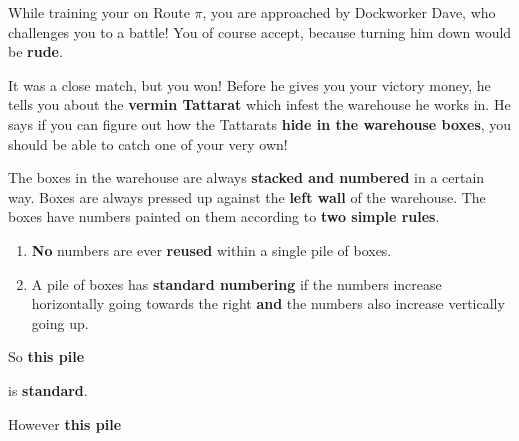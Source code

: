 
While training your \mappMobimon{} on Route \( \pi \), you are approached by
Dockworker Dave, who challenges you to a \mappMobimon{} battle! You of course
accept, because turning him down would be \textbf{rude}.

It was a close match, but you won! Before he gives you your victory money, he
tells you about the \textbf{vermin \mappMobimon{} Tattarat} which infest the
warehouse he works in. He says if you can figure out how the Tattarats
\textbf{hide in the warehouse boxes}, you should be able to catch one of your
very own!

The boxes in the warehouse are always \textbf{stacked and numbered} in a certain
way. Boxes are always pressed up against the \textbf{left wall} of the
warehouse. The boxes have numbers painted on them according to \textbf{two
  simple rules}.
\begin{enumerate}
\item \textbf{No} numbers are ever \textbf{reused} within a single pile of boxes.
\item A pile of boxes has \textbf{standard numbering} if the numbers increase
  horizontally going towards the right \textbf{and} the numbers also increase
  vertically going up.
\end{enumerate}

So \textbf{this pile}
\begin{center}
\end{center}
is \textbf{standard}.

However \textbf{this pile}
\begin{center}
\end{center}

